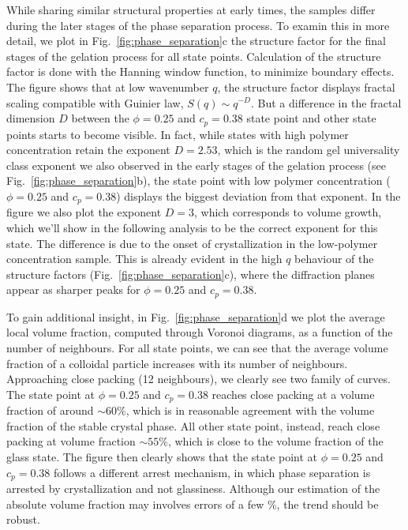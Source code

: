 \documentclass[twocolumn,showpacs,amsmath,amssymb,pre,superscriptaddress]{revtex4}
\begin{document}
While sharing similar structural properties at early times, the samples differ during the later stages of the phase separation process.
To examin this in more detail, we plot in Fig.~\ref{fig:phase_separation}c the structure factor for the final stages of the gelation process for all state points.
Calculation of the structure factor is done with the Hanning window function, to minimize boundary effects.
The figure shows that at low wavenumber $q$, the structure factor displays fractal scaling compatible with Guinier law, $S(q)\sim q^{-D}$.
But a difference
in the fractal dimension $D$ between the $\phi=0.25$ and $c_p=0.38$ state point and other state points starts to become visible. In fact, while states
with high polymer concentration retain the exponent $D=2.53$,
which is the random gel universality class exponent we also observed in the early stages of the gelation process (see Fig.~\ref{fig:phase_separation}b),
the state point with low polymer concentration ($\phi=0.25$ and $c_p=0.38$) displays the biggest deviation from that exponent. In the figure we also
plot the exponent $D=3$, which corresponds to volume growth, which we'll show in the following analysis to be the correct exponent for this state.
The difference is due to the onset of crystallization in the low-polymer concentration sample. This is already evident in the high $q$ behaviour of
the structure factors (Fig.~\ref{fig:phase_separation}c), where the diffraction planes appear as sharper peaks for $\phi=0.25$ and $c_p=0.38$.

To gain additional insight, in Fig.~\ref{fig:phase_separation}d we plot the average local volume fraction, computed
through Voronoi diagrams, as a function of the number of neighbours. For all state points, we can see that the average volume fraction of a colloidal
particle increases with its number of neighbours. Approaching close packing (12 neighbours), we clearly see two family of curves. The state point
at $\phi=0.25$ and $c_p=0.38$ reaches close packing at a volume fraction of around $\sim 60\%$, which is in reasonable agreement with the
volume fraction of the stable crystal phase. All other state point, instead, reach close packing at volume fraction $\sim 55\%$, which is
close to the volume fraction of the glass state. 
The figure then clearly shows that the state point at $\phi=0.25$ and $c_p=0.38$ follows a different arrest mechanism, in which phase separation
is arrested by crystallization and not glassiness. Although our estimation of the absolute volume fraction may involves errors of a few \%, the trend should be robust.
\end{document}
